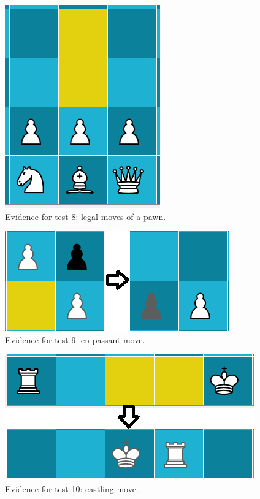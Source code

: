 \begin{figure}[H]
	\centering
	\includegraphics{images/screenshots/test-8}
	\caption{Evidence for test 8: legal moves of a pawn.}
	\label{test-8}
\end{figure}
\begin{figure}[H]
	\centering
	\includegraphics{images/screenshots/test-9}
	\caption{Evidence for test 9: en passant move.}
	\label{test-9}
\end{figure}
\begin{figure}[H]
	\centering
	\includegraphics{images/screenshots/test-10}
	\caption{Evidence for test 10: castling move.}
	\label{test-10}
\end{figure}
